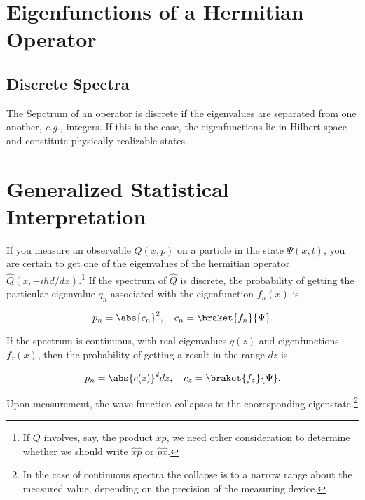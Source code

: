 \documentclass[a4paper,12pt]{report}
\begin{document}
\section{Eigenfunctions of a Hermitian Operator}

\subsection{Discrete Spectra}

The Sepctrum of an operator is discrete if the eigenvalues are separated from one another, \textit{e.g.,} integers. If this is the case, the eigenfunctions lie in Hilbert space and constitute physically realizable states. 

\section{Generalized Statistical Interpretation}

If you measure an observable \(Q(x,p)\) on a particle in the state \(\Psi (x,t)\), you are certain to get one of the eigenvalues of the hermitian operator \(\hat{Q}  \left(x,-i\hbar d /dx \right)\).\footnote{If \(Q\) involves, say, the product \(xp\), we need other consideration to determine whether we should write \(\hat{x} \hat{p} \text { or } \hat{p} \hat{x}  \).} If the spectrum of \(\hat{Q} \) is discrete, the probability of getting the particular eigenvalue \(q_{n} \) associated with the eigenfunction \(f_{n} (x)\) is 

\begin{equation}
  p_{n} = \abs{c_{n} }^2, \quad c_{n} = \braket{f_{n} }{\Psi } .    
\end{equation}

If the spectrum is continuous, with real eigenvalues \(q(z)\) and eigenfunctions \(f_{z} (x)\), then the probability of getting a result in the range \(dz\) is 

\begin{equation}
  p_{n} = \abs{c(z)}^2dz, \quad c_{z} = \braket{f_{z} }{\Psi }.
\end{equation}

Upon measurement, the wave function collapses to the cooresponding eigenstate.\footnote{In the case of continuous spectra the collapse is to a narrow range about the measured value, depending on the precision of the measuring device.} 
\end{document}
